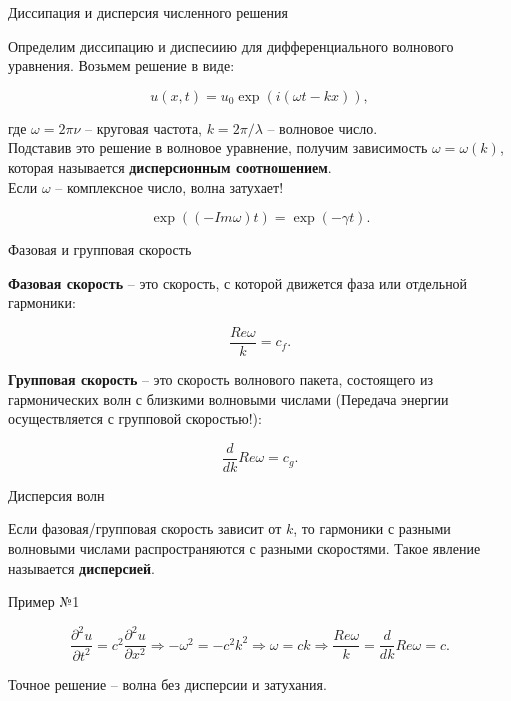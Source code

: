 \documentclass[10pt,xcolor=pst,aspectratio=169]{beamer}
\begin{document}
\begin{frame}{Диссипация и дисперсия численного решения}

	\transdissolve[duration=0.1]
	\justifying
	\large

	Определим диссипацию и диспесиию для дифференциального волнового уравнения. Возьмем решение в виде:

	\[
		u(x, t) = u_{0} \exp{(i (\omega t - k x))},
	\]

	где $\omega = 2 \pi \nu$ -- круговая частота, $k = 2 \pi / \lambda$ -- волновое число.\\

	Подставив это решение в волновое уравнение, получим зависимость $\omega = \omega(k)$, которая называется \textbf{дисперсионным соотношением}.\\

	Если $\omega$ -- комплексное число, волна затухает!

	\[
		\exp{((- Im \omega) t)} = \exp{(- \gamma t)}.
	\]

\end{frame}

\begin{frame}{Фазовая и групповая скорость}

	\transdissolve[duration=0.1]
	\justifying
	\large

	\textbf{Фазовая скорость} -- это скорость, с которой движется фаза или отдельной гармоники:

	\[
		\frac{Re \omega}{k} = c_{f}.
	\]

	\textbf{Групповая скорость} -- это скорость волнового пакета, состоящего из гармонических волн с близкими волновыми числами (Передача энергии осуществляется с групповой скоростью!):

	\[
		\frac{d}{d k} Re \omega = c_{g}.
	\]

\end{frame}

\begin{frame}{Дисперсия волн}

	\transdissolve[duration=0.1]
	\justifying
	\large

	Если фазовая/групповая скорость зависит от $k$, то гармоники с разными волновыми числами распространяются с разными скоростями. Такое явление называется \textbf{дисперсией}.

\end{frame}

\begin{frame}{Пример №1}

	\transdissolve[duration=0.1]
	\justifying
	\large

	\[
		\frac{\partial^{2} u}{\partial t^{2}} = c^{2} \frac{\partial^{2} u}{\partial x^{2}} \Rightarrow - \omega^{2} = - c^{2} k^{2} \Rightarrow \omega = c k \Rightarrow \frac{Re \omega}{k} = \frac{d}{d k} Re \omega = c.
	\]
	
	Точное решение -- волна без дисперсии и затухания.

\end{frame}
\end{document}

